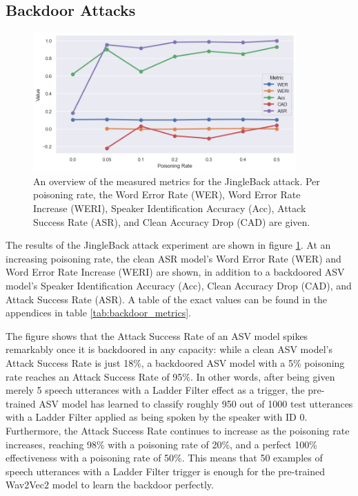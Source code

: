 \documentclass[11pt]{article}
\begin{document}
\subsection{Backdoor Attacks}
\begin{figure}
    \centering
    \includegraphics[width=0.9\textwidth]{backdoor_metrics.png}
    \caption{An overview of the measured metrics for the JingleBack attack. Per poisoning rate, the Word Error Rate (WER), Word Error Rate Increase (WERI), Speaker Identification Accuracy (Acc), Attack Success Rate (ASR), and Clean Accuracy Drop (CAD) are given.}
    \label{fig:backdoor_metrics}
\end{figure}

The results of the JingleBack attack experiment are shown in figure \ref{fig:backdoor_metrics}.
At an increasing poisoning rate, the clean ASR model's Word Error Rate (WER) and Word Error Rate Increase (WERI) are shown, in addition to a backdoored ASV model's Speaker Identification Accuracy (Acc), Clean Accuracy Drop (CAD), and Attack Success Rate (ASR).
A table of the exact values can be found in the appendices in table \ref{tab:backdoor_metrics}.

The figure shows that the Attack Success Rate of an ASV model spikes remarkably once it is backdoored in any capacity: while a clean ASV model's Attack Success Rate is just 18\%, a backdoored ASV model with a 5\% poisoning rate reaches an Attack Success Rate of 95\%.
In other words, after being given merely 5 speech utterances with a Ladder Filter effect as a trigger, the pre-trained ASV model has learned to classify roughly 950 out of 1000 test utterances with a Ladder Filter applied as being spoken by the speaker with ID 0.
Furthermore, the Attack Success Rate continues to increase as the poisoning rate increases, reaching 98\% with a poisoning rate of 20\%, and a perfect 100\% effectiveness with a poisoning rate of 50\%.
This means that 50 examples of speech utterances with a Ladder Filter trigger is enough for the pre-trained Wav2Vec2 model to learn the backdoor perfectly.
\end{document}
